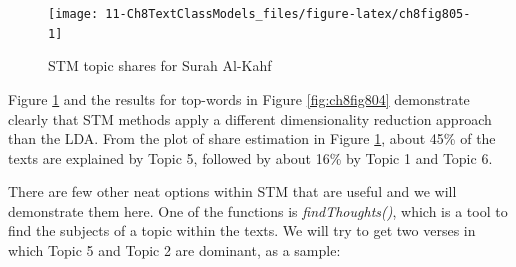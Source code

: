 \documentclass[
]{article}
\newenvironment{Shaded}{\begin{snugshade}}{\end{snugshade}}
\newcommand{\AttributeTok}[1]{\textcolor[rgb]{0.13,0.29,0.53}{#1}}
\newcommand{\DecValTok}[1]{\textcolor[rgb]{0.00,0.00,0.81}{#1}}
\newcommand{\FunctionTok}[1]{\textcolor[rgb]{0.13,0.29,0.53}{\textbf{#1}}}
\newcommand{\NormalTok}[1]{#1}
\newcommand{\OtherTok}[1]{\textcolor[rgb]{0.56,0.35,0.01}{#1}}
\newcommand{\SpecialCharTok}[1]{\textcolor[rgb]{0.81,0.36,0.00}{\textbf{#1}}}
\newcommand{\StringTok}[1]{\textcolor[rgb]{0.31,0.60,0.02}{#1}}
\begin{document}
\begin{figure}

{\centering \texttt{[image: 11-Ch8TextClassModels\_files/figure-latex/ch8fig805-1]} 

}

\caption{STM topic shares for Surah Al-Kahf}\label{fig:ch8fig805}
\end{figure}

Figure \ref{fig:ch8fig805} and the results for top-words in Figure \ref{fig:ch8fig804} demonstrate clearly that STM methods apply a different dimensionality reduction approach than the LDA. From the plot of share estimation in Figure \ref{fig:ch8fig805}, about 45\% of the texts are explained by Topic 5, followed by about 16\% by Topic 1 and Topic 6.

There are few other neat options within STM that are useful and we will demonstrate them here. One of the functions is \emph{findThoughts()}, which is a tool to find the subjects of a topic within the texts. We will try to get two verses in which Topic 5 and Topic 2 are dominant, as a sample:

\begin{Shaded}
\end{Shaded}
\end{document}
